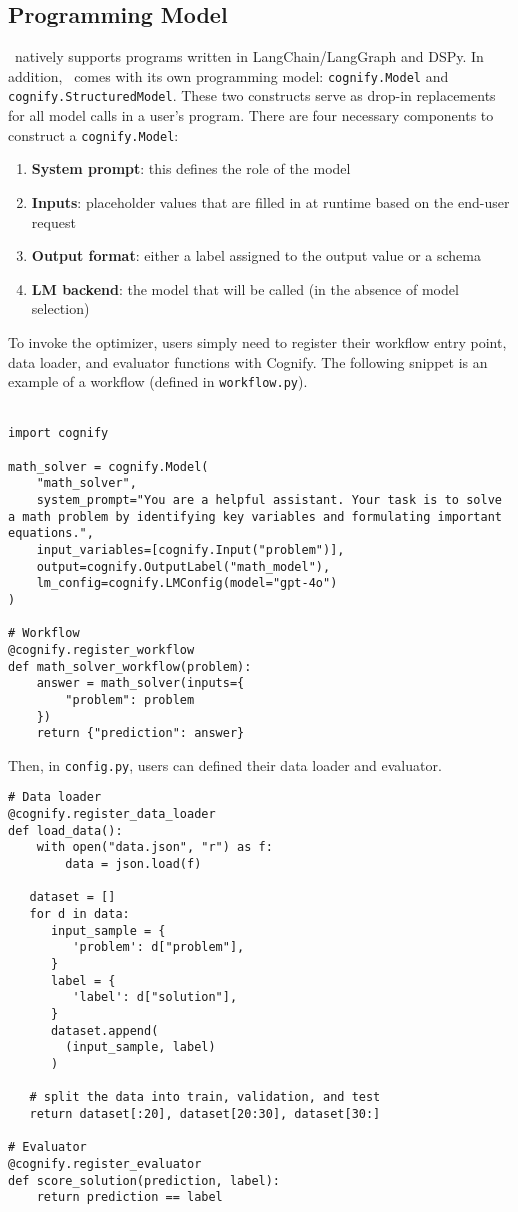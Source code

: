 \subsection{Programming Model}
\label{sec:programming-model}

\sysname\ natively supports programs written in LangChain/LangGraph and DSPy. In addition, \sysname\ comes with its own programming model: \texttt{cognify.Model} and \texttt{cognify.StructuredModel}. These two constructs serve as drop-in replacements for all model calls in a user's program. There are four necessary components to construct a \texttt{cognify.Model}:
\begin{enumerate}
    \item \textbf{System prompt}: this defines the role of the model
    \item \textbf{Inputs}: placeholder values that are filled in at runtime based on the end-user request
    \item \textbf{Output format}: either a label assigned to the output value or a schema 
    \item \textbf{LM backend}: the model that will be called (in the absence of model selection)
\end{enumerate}

To invoke the optimizer, users simply need to register their workflow entry point, data loader, and evaluator functions with Cognify. The following snippet is an example of a workflow (defined in \texttt{workflow.py}).
\\
\\
\begin{lstlisting}[style=pythonstyle]
import cognify

math_solver = cognify.Model(
    "math_solver",
    system_prompt="You are a helpful assistant. Your task is to solve a math problem by identifying key variables and formulating important equations.",
    input_variables=[cognify.Input("problem")],
    output=cognify.OutputLabel("math_model"),
    lm_config=cognify.LMConfig(model="gpt-4o")
)

# Workflow
@cognify.register_workflow
def math_solver_workflow(problem):
    answer = math_solver(inputs={
        "problem": problem
    })
    return {"prediction": answer}
\end{lstlisting}

Then, in \texttt{config.py}, users can defined their data loader and evaluator.

\begin{lstlisting}[style=pythonstyle]
# Data loader
@cognify.register_data_loader
def load_data():
    with open("data.json", "r") as f:
        data = json.load(f)

   dataset = []
   for d in data:
      input_sample = {
         'problem': d["problem"],
      }
      label = {
         'label': d["solution"],
      }
      dataset.append(
        (input_sample, label)
      )

   # split the data into train, validation, and test
   return dataset[:20], dataset[20:30], dataset[30:]

# Evaluator
@cognify.register_evaluator
def score_solution(prediction, label):
    return prediction == label
\end{lstlisting}


